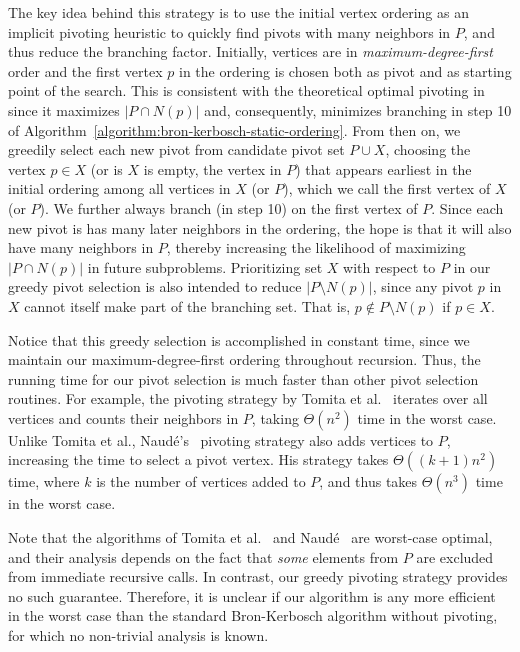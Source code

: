 \documentclass[final,1p]{elsarticle-modified}
\begin{document}
The key idea behind this strategy is to use the initial vertex ordering as an implicit pivoting heuristic to quickly find pivots with many neighbors in $P$, and thus reduce the branching factor. Initially, vertices are in \emph{maximum-degree-first} order and the first vertex $p$ in the ordering is chosen both as pivot and as starting point of the search. This is consistent with the theoretical optimal pivoting in~\cite{tomita-2006} since it maximizes $|P\cap N(p)|$ and, consequently, minimizes branching in step 10 of Algorithm~\ref{algorithm:bron-kerbosch-static-ordering}. From then on, we greedily select each new pivot from candidate pivot set $P\cup X$, choosing the vertex $p\in X$ (or is $X$ is empty, the vertex in $P$) that appears earliest in the initial ordering among all vertices in $X$ (or $P$), which we call the first vertex of $X$ (or $P$). We further always branch (in step 10) on the first vertex of $P$. Since each new pivot is has many later neighbors in the ordering, the hope is that it will also have many neighbors in $P$, thereby increasing the likelihood of maximizing $|P\cap N(p)|$ in future subproblems. Prioritizing set $X$ with respect to $P$ in our greedy pivot selection is also intended to reduce $|P\setminus N(p)|$, since any pivot $p$ in $X$ cannot itself make part of the branching set. That is, $p\not\in P\setminus N(p)$ if $p\in X$. 


Notice that this greedy selection is accomplished in constant time, since we maintain our maximum-degree-first ordering throughout recursion. Thus, the running time for our pivot selection is much faster than other pivot selection routines. For example, the pivoting strategy by Tomita et al.~\cite{tomita-2006} iterates over all vertices and counts their neighbors in $P$, taking $\Theta(n^2)$ time in the worst case. Unlike Tomita et al., Naud\'e's~\cite{naude-2016} pivoting strategy also adds vertices to $P$, increasing the time to select a pivot vertex. His strategy takes $\Theta((k+1)n^2)$ time, where $k$ is the number of vertices added to $P$, and thus takes $\Theta(n^3)$ time in the worst case.

Note that the algorithms of Tomita et al.~\cite{tomita-2006} and Naud\'e~\cite{naude-2016} are worst-case optimal, and their analysis depends on the fact that \emph{some} elements from $P$ are excluded from immediate recursive calls. In contrast, our greedy pivoting strategy provides no such guarantee. Therefore, it is unclear if our algorithm is any more efficient in the worst case than the standard Bron-Kerbosch algorithm without pivoting, for which no non-trivial analysis is known.
\end{document}
